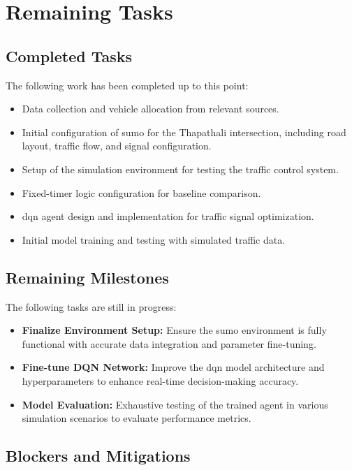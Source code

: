 \chapter{Remaining Tasks}
\label{chap:remaining_tasks}

\section{Completed Tasks}
\label{sec:completed_tasks}
The following work has been completed up to this point:
\begin{itemize}
    \item Data collection and vehicle allocation from relevant sources.
    \item Initial configuration of \gls{sumo} for the Thapathali intersection, including road layout, traffic flow, and signal configuration.
    \item Setup of the simulation environment for testing the traffic control system.
    \item Fixed-timer logic configuration for baseline comparison.
    \item \gls{dqn} agent design and implementation for traffic signal optimization.
    \item Initial model training and testing with simulated traffic data.
\end{itemize}

\section{Remaining Milestones}
\label{sec:remaining_milestones}
The following tasks are still in progress:
\begin{itemize}
    \item \textbf{Finalize Environment Setup:} Ensure the \gls{sumo} environment is fully functional with accurate data integration and parameter fine-tuning.
    \item \textbf{Fine-tune DQN Network:} Improve the \gls{dqn} model architecture and hyperparameters to enhance real-time decision-making accuracy.
    \item \textbf{Model Evaluation:} Exhaustive testing of the trained agent in various simulation scenarios to evaluate performance metrics.
\end{itemize}

\section{Blockers and Mitigations}
\label{sec:blockers_mitigations}

